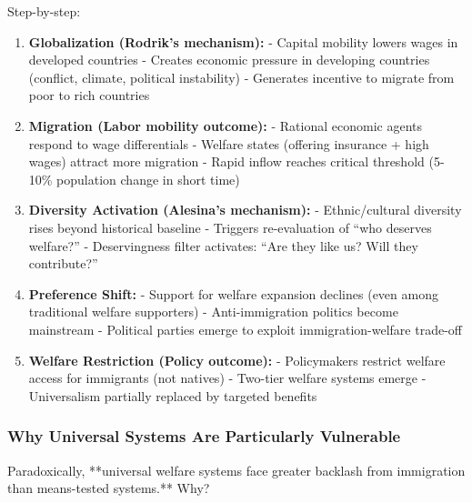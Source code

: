 Step-by-step:

\begin{enumerate}

\item \textbf{Globalization (Rodrik's mechanism):}
   - Capital mobility lowers wages in developed countries
   - Creates economic pressure in developing countries (conflict, climate, political instability)
   - Generates incentive to migrate from poor to rich countries

\item \textbf{Migration (Labor mobility outcome):}
   - Rational economic agents respond to wage differentials
   - Welfare states (offering insurance + high wages) attract more migration
   - Rapid inflow reaches critical threshold (5-10\% population change in short time)

\item \textbf{Diversity Activation (Alesina's mechanism):}
   - Ethnic/cultural diversity rises beyond historical baseline
   - Triggers re-evaluation of ``who deserves welfare?''
   - Deservingness filter activates: ``Are they like us? Will they contribute?''

\item \textbf{Preference Shift:}
   - Support for welfare expansion declines (even among traditional welfare supporters)
   - Anti-immigration politics become mainstream
   - Political parties emerge to exploit immigration-welfare trade-off

\item \textbf{Welfare Restriction (Policy outcome):}
   - Policymakers restrict welfare access for immigrants (not natives)
   - Two-tier welfare systems emerge
   - Universalism partially replaced by targeted benefits

\end{enumerate}

\subsubsection{Why Universal Systems Are Particularly Vulnerable}

Paradoxically, **universal welfare systems face greater backlash from immigration than means-tested systems.** Why?

